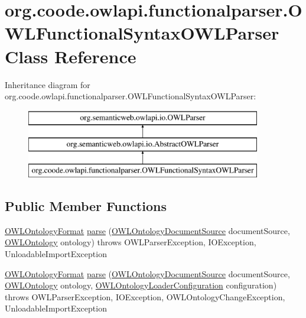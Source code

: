\hypertarget{classorg_1_1coode_1_1owlapi_1_1functionalparser_1_1_o_w_l_functional_syntax_o_w_l_parser}{\section{org.\-coode.\-owlapi.\-functionalparser.\-O\-W\-L\-Functional\-Syntax\-O\-W\-L\-Parser Class Reference}
\label{classorg_1_1coode_1_1owlapi_1_1functionalparser_1_1_o_w_l_functional_syntax_o_w_l_parser}
}
Inheritance diagram for org.\-coode.\-owlapi.\-functionalparser.\-O\-W\-L\-Functional\-Syntax\-O\-W\-L\-Parser\-:\begin{figure}[H]
\begin{center}
\leavevmode
\includegraphics[height=3.000000cm]{classorg_1_1coode_1_1owlapi_1_1functionalparser_1_1_o_w_l_functional_syntax_o_w_l_parser}
\end{center}
\end{figure}
\subsection*{Public Member Functions}
\begin{DoxyCompactItemize}
\item 
\hyperlink{classorg_1_1semanticweb_1_1owlapi_1_1model_1_1_o_w_l_ontology_format}{O\-W\-L\-Ontology\-Format} \hyperlink{classorg_1_1coode_1_1owlapi_1_1functionalparser_1_1_o_w_l_functional_syntax_o_w_l_parser_a954972fee0efd0775cc7dcdb98376f8a}{parse} (\hyperlink{interfaceorg_1_1semanticweb_1_1owlapi_1_1io_1_1_o_w_l_ontology_document_source}{O\-W\-L\-Ontology\-Document\-Source} document\-Source, \hyperlink{interfaceorg_1_1semanticweb_1_1owlapi_1_1model_1_1_o_w_l_ontology}{O\-W\-L\-Ontology} ontology)  throws O\-W\-L\-Parser\-Exception, I\-O\-Exception, Unloadable\-Import\-Exception 
\item 
\hyperlink{classorg_1_1semanticweb_1_1owlapi_1_1model_1_1_o_w_l_ontology_format}{O\-W\-L\-Ontology\-Format} \hyperlink{classorg_1_1coode_1_1owlapi_1_1functionalparser_1_1_o_w_l_functional_syntax_o_w_l_parser_a94dd34895ca7ac191b9feabed1d09449}{parse} (\hyperlink{interfaceorg_1_1semanticweb_1_1owlapi_1_1io_1_1_o_w_l_ontology_document_source}{O\-W\-L\-Ontology\-Document\-Source} document\-Source, \hyperlink{interfaceorg_1_1semanticweb_1_1owlapi_1_1model_1_1_o_w_l_ontology}{O\-W\-L\-Ontology} ontology, \hyperlink{classorg_1_1semanticweb_1_1owlapi_1_1model_1_1_o_w_l_ontology_loader_configuration}{O\-W\-L\-Ontology\-Loader\-Configuration} configuration)  throws O\-W\-L\-Parser\-Exception, I\-O\-Exception, O\-W\-L\-Ontology\-Change\-Exception, Unloadable\-Import\-Exception 
\end{DoxyCompactItemize}
